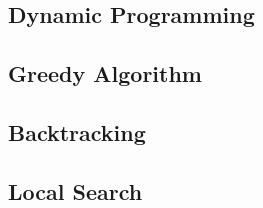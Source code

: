 

\subsection{Dynamic Programming}

\subsection{Greedy Algorithm}

\subsection{Backtracking}

\subsection{Local Search}

%